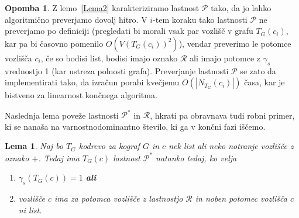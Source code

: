 \documentclass[12pt,a4paper,twoside]{article}
\theoremstyle{definition} %
\newtheorem{opomba}[definicija]{Opomba}
\theoremstyle{plain} %
\newtheorem{lema}[definicija]{Lema}
\numberwithin{equation}{section}  %
\begin{document}
\begin{opomba}\label{opombaLema2}
Z lemo~\ref{Lema2} karakteriziramo lastnost $\mathcal{P}$ tako, da jo lahko algoritmično preverjamo dovolj hitro. V $i$-tem koraku tako lastnosti $\mathcal{P}$ ne preverjamo po definiciji (pregledati bi morali vsak par vozlišč v grafu $T_G(c_i)$, kar pa bi časovno pomenilo $O(V(T_G(c_i))^2)$), vendar preverimo le potomce vozlišča $c_i$, če so bodisi list, bodisi imajo oznako $\mathcal{R}$ ali imajo potomce z $\gamma_s$ vrednostjo 1 (kar ustreza polnosti grafa). Preverjanje lastnosti $\mathcal{P}$ se zato da implementirati tako, da izračun porabi kvečjemu $O(|N_{T_G}(c_i)|)$ časa, kar je bistveno za linearnost končnega algoritma.
\end{opomba}

Naslednja lema poveže lastnosti $\mathcal{P^*}$ in $\mathcal{R}$, hkrati pa obravnava tudi robni primer, ki se nanaša na varnostnodominantno število, ki ga v končni fazi iščemo.
\begin{lema}\label{Lema3}Naj bo $T_G$ kodrevo za kograf $G$ in $c$ nek list ali neko notranje vozlišče z oznako $+$. Tedaj ima $T_G(c)$ lastnost $\mathcal{P^*}$ natanko tedaj, ko velja
\begin{enumerate}[label=($\roman*$)]
\item $\gamma_s(T_G(c))=1$ \textbf{ali}
\item vozlišče $c$ ima za potomca vozlišče z lastnostjo $\mathcal{R}$ in noben potomec vozlišča $c$ ni list.
\end{enumerate}
\end{lema}
\end{document}
